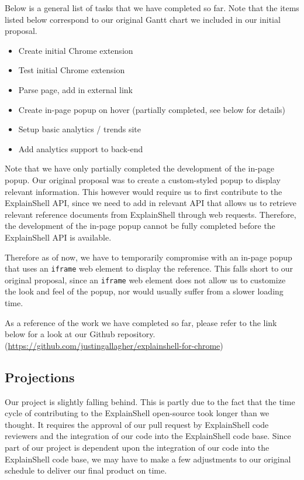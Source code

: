 \documentclass[11pt]{article}
\begin{document}
Below is a general list of tasks that we have completed so far. 
Note that the items listed below correspond to our original Gantt chart we
included in our initial proposal.
\begin{itemize}
  \item Create initial Chrome extension
  \item Test initial Chrome extension
  \item Parse page, add in external link
  \item Create in-page popup on hover (partially completed, see below 
  for details)
  \item Setup basic analytics / trends site
  \item Add analytics support to back-end 
\end{itemize}
Note that we have only partially completed the development of the in-page
popup. Our original proposal was to create a custom-styled popup to display
relevant information. This however would require us to first contribute to the
ExplainShell API, since we need to add in relevant API that allows us to
retrieve relevant reference documents from ExplainShell through web requests.
Therefore, the development of the in-page popup cannot be fully completed
before the ExplainShell API is available.

Therefore as of now, we have to temporarily compromise with an in-page popup 
that uses an \texttt{iframe} web element to display the reference. This falls
short to our original proposal, since an \texttt{iframe} web element does not
allow us to customize the look and feel of the popup, nor would usually suffer
from a slower loading time.

As a reference of the work we have completed so far, please refer to the link
 below for a look at our Github repository.
(\url{https://github.com/justingallagher/explainshell-for-chrome})

\subsection{Projections}
Our project is slightly falling behind. This is partly due to the fact that
the time cycle of contributing to the ExplainShell open-source took longer 
than we thought. It requires the approval of our pull request by
ExplainShell code reviewers and the
integration of our code into the ExplainShell code base. Since part of our
project is dependent upon the integration of our code into the ExplainShell
code base, we may have to make a few adjustments to our original schedule
to deliver our final product on time.
\end{document}
